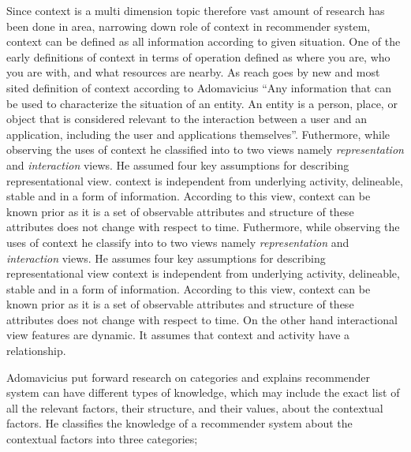Since context is a multi dimension topic therefore vast amount of research has been done in area, narrowing down role of context in recommender system, context can be defined as all information according to given situation. One of the early definitions of context in terms of operation \cite{schilit1994disseminating} defined as where you are, who you are with, and what resources are nearby.  As reach goes by new and most sited definition of context according to Adomavicius \cite{adomavicius2011context} “Any information  that  can  be  used  to characterize  the  situation  of  an entity.  An entity is a person, place, or object that is considered relevant to the interaction between a user and an application, including the user and applications  themselves”. Futhermore, \cite{dourish2004we} while observing the uses of context he classified into to two views namely \textit{ representation } and \textit{ interaction } views.  He assumed four key assumptions for describing representational view. context is independent from underlying activity, delineable, stable and in a form of information. According to this view, context can be known prior as it is a set of observable attributes and structure of these attributes does not change with respect to  time. Futhermore, \cite{dourish2004we} while observing the uses of context he classify into to two views namely \textit{ representation } and \textit{ interaction } views.  He assumes four key assumptions for describing representational view context is independent from underlying activity, delineable, stable and in a form of information. According to this view, context can be known prior as it is a set of observable attributes and structure of these attributes does not change with respect to time. On the other hand interactional view features are dynamic. It assumes that context and activity have a relationship.\newline

Adomavicius \cite{adomavicius2011context} put forward research \cite{dourish2004we} on categories  and  explains recommender system can have different types of knowledge, which may include the exact list of all the relevant factors, their structure, and their values, about the contextual factors. He classifies the knowledge of a recommender system about the contextual factors into three categories; \newline

